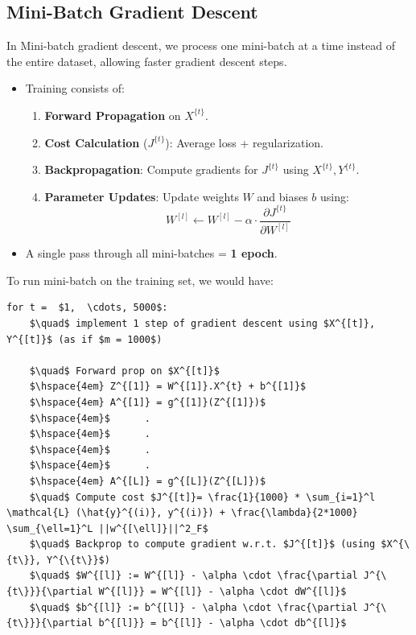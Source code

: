 \documentclass[letterpaper,12pt,notitlepage,twoside]{report}
\begin{document}
\subsection{Mini-Batch Gradient Descent}
In Mini-batch gradient descent, we process one mini-batch at a time instead of the entire dataset, allowing faster gradient descent steps.
\begin{itemize}[nosep]
    \item Training consists of:
    \begin{enumerate}
        \item \textbf{Forward Propagation} on $X^{\{t\}}$.
        \item \textbf{Cost Calculation} ($J^{\{t\}}$): Average loss + regularization.
        \item \textbf{Backpropagation}: Compute gradients for $J^{\{t\}}$ using $X^{\{t\}}, Y^{\{t\}}$.
        \item \textbf{Parameter Updates}: Update weights $W$ and biases $b$ using:
        \[
        W^{[l]} \gets W^{[l]} - \alpha \cdot \frac{\partial J^{\{t\}}}{\partial W^{[l]}}
        \]
    \end{enumerate}
    \item A single pass through all mini-batches = \textbf{1 epoch}.
\end{itemize}

To run mini-batch on the training set, we would have:
\begin{lstlisting}
for t =  $1,  \cdots, 5000$: 
	$\quad$ implement 1 step of gradient descent using $X^{[t]}, Y^{[t]}$ (as if $m = 1000$)
	
	$\quad$ Forward prop on $X^{[t]}$
	$\hspace{4em} Z^{[1]} = W^{[1]}.X^{t} + b^{[1]}$
	$\hspace{4em} A^{[1]} = g^{[1]}(Z^{[1]})$
	$\hspace{4em}$		.
	$\hspace{4em}$		.
	$\hspace{4em}$		.
	$\hspace{4em}$		.
	$\hspace{4em} A^{[L]} = g^{[L]}(Z^{[L]})$
	$\quad$ Compute cost $J^{[t]}= \frac{1}{1000} * \sum_{i=1}^l \mathcal{L} (\hat{y}^{(i)}, y^{(i)}) + \frac{\lambda}{2*1000} \sum_{\ell=1}^L ||w^{[\ell]}||^2_F$
	$\quad$ Backprop to compute gradient w.r.t. $J^{[t]}$ (using $X^{\{t\}}, Y^{\{t\}}$)
	$\quad$ $W^{[l]} := W^{[l]} - \alpha \cdot \frac{\partial J^{\{t\}}}{\partial W^{[l]}} = W^{[l]} - \alpha \cdot dW^{[l]}$
	$\quad$ $b^{[l]} := b^{[l]} - \alpha \cdot \frac{\partial J^{\{t\}}}{\partial b^{[l]}} = b^{[l]} - \alpha \cdot db^{[l]}$
\end{lstlisting}
\end{document}
